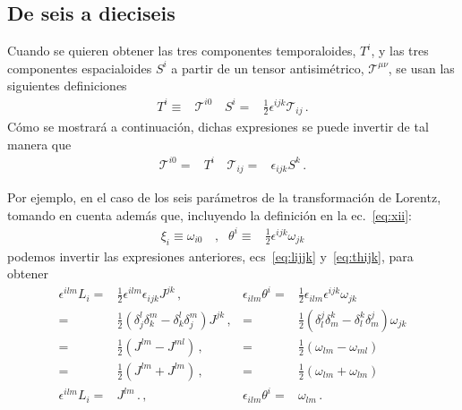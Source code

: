 \subsection{De seis a dieciseis}
\begin{frame}
Cuando se quieren obtener las tres componentes temporaloides, $T^i$, y las tres componentes espacialoides $S^i$
a partir de un tensor antisimétrico, $\mathcal{T}^{\mu\nu}$, se usan las siguientes definiciones
\begin{align}
  T^i\equiv &\mathcal{T}^{i0}\,& S^i=& \frac{1}{2}\epsilon^{ijk}\mathcal{T}_{ij}\,.
\end{align}
Cómo se mostrará a continuación, dichas expresiones se puede invertir de tal manera que
\begin{align}
  \mathcal{T}^{i0}= &T^i\,& \mathcal{T}_{ij} =&\epsilon_{ijk}S^k\,.
\end{align}
\end{frame}

Por ejemplo, en el caso de los seis parámetros de la transformación de Lorentz, tomando en cuenta además que, incluyendo la definición  en la ec.~\eqref{eq:xii}:
\begin{align}
\label{eq:thijk}
\xi_i\equiv \omega_{i0}&\,,&\theta^i\equiv&\frac{1}{2}\epsilon^{ijk}\omega_{jk}
\end{align}
podemos invertir las expresiones anteriores, ecs~\eqref{eq:lijjk} y~\eqref{eq:thijk}, para obtener
\begin{align}
\epsilon^{ilm}L_i=&\frac{1}{2}\epsilon^{ilm}\epsilon_{ijk}J^{jk}               \,,&\epsilon_{ilm}\theta^i=&\frac{1}{2}\epsilon_{ilm}\epsilon^{ijk}\omega_{jk}         \nonumber\\
  =&\frac{1}{2}\left( \delta_j^l\delta_k^m-\delta_k^l\delta_j^m \right)J^{jk} \,,& =&\frac{1}{2}\left( \delta_l^j\delta_m^k-\delta_l^k\delta_m^j \right)\omega_{jk} \nonumber\\
  =&\frac{1}{2}\left(J^{lm}-J^{ml} \right)                                   \,,& =&\frac{1}{2}\left(\omega_{lm}-\omega_{ml} \right)                         \nonumber\\
  =&\frac{1}{2}\left(J^{lm}+J^{lm} \right)                                   \,,& =&\frac{1}{2}\left(\omega_{lm}+\omega_{lm} \right)                     \nonumber\\
\epsilon^{ilm}L_i=&J^{lm}\,.                                                                \,,&\epsilon_{ilm}\theta^i=&\omega_{lm}\,.
\end{align}

